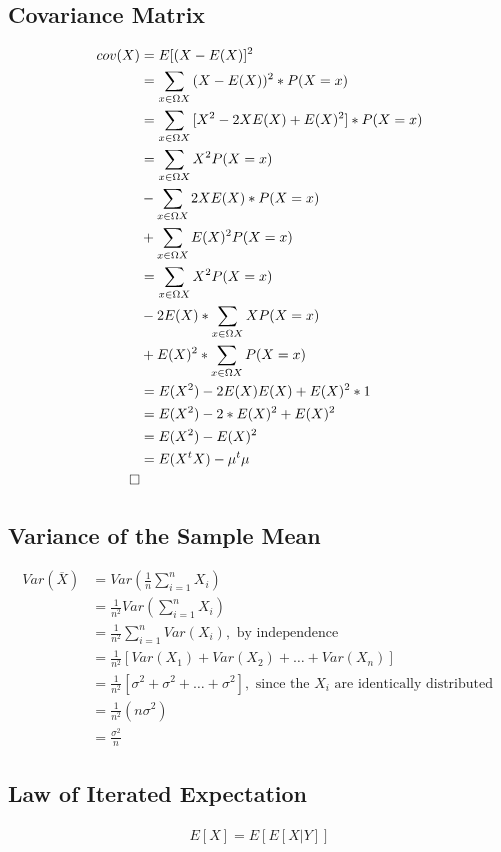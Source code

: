 \documentclass[]{article}
\begin{document}
\subsection{Covariance Matrix}

\begin{align}
cov(X) &= E[(X-E(X)]^2\\
&= \sum_{x\in \Omega X} {(X-E(X))^2*P(X=x)}\\
&= \sum_{x\in \Omega X} {[X^2-2XE(X)+E(X)^2]*P(X=x)}\\
&= \sum_{x\in \Omega X} {X^2P(X=x)} \\&- \sum_{x\in \Omega X} {2XE(X)*P(X=x)} \\&+ \sum_{x \in \Omega X} {E(X)^2P(X=x)}\\
&= \sum_{x\in \Omega X} {X^2P(X=x)} \\&- 2E(X)*\sum_{x\in \Omega X} {XP(X=x)} \\&+ E(X)^2*\sum_{x \in \Omega X} {P(X=x)}\\
&= E(X^2)-2E(X)E(X)+E(X)^2*1\\
&= E(X^2)-2*E(X)^2+E(X)^2\\
&= E(X^2)-E(X)^2\\
&= E(X^tX)-\mu^t\mu\\
\qed
\end{align}

\subsection{Variance of the Sample Mean}

\begin{align}
Var\left({\overline{X}}\right)&=Var\left( \frac{1}{n}\sum_{i=1}^nX_i\right)\\&= \frac{1}{n^2}Var\left( \sum_{i=1}^nX_i\right)\\&=\frac{1}{n^2}\sum_{i=1}^nVar(X_i), \text{ by independence}\\&= \frac{1}{n^2}\left[Var(X_1)+Var(X_2)+\ldots+Var(X_n) \right]\\&=\frac{1}{n^2}\left[\sigma^2+\sigma^2+\ldots+\sigma^2  \right], \text{ since the }X_i \text{ are identically distributed }\\&= \frac{1}{n^2}(n\sigma^2)\\&=\frac{\sigma^2}{n}
\end{align}

\subsection {Law of Iterated Expectation}
\begin{align}
	E[X] = E[ E[X|Y] ]
\end{align}
\end{document}

